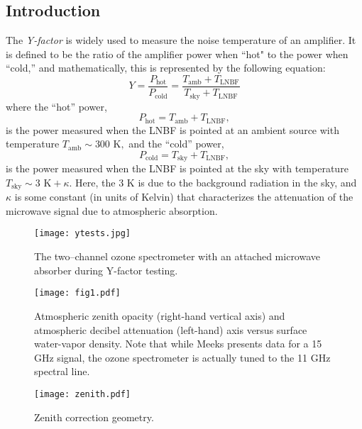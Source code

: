 \documentclass[11pt]{article}
\begin{document}
\subsection{Introduction}
The \textit{Y-factor} is widely used to measure the noise temperature of an amplifier. It is defined to be the ratio of the amplifier power when ``hot" to the power when ``cold,'' and mathematically, this is represented by the following equation:
	\begin{equation}\label{AOK}
		Y = \frac{P_\text{hot}}{P_\text{cold}} = \frac{T_\text{amb}+T_\text{LNBF}}{T_\text{sky}+T_\text{LNBF}}
	\end{equation}
where the ``hot'' power,
	\begin{equation}
		P_\text{hot}=T_\text{amb}+T_\text{LNBF},
	\end{equation} 
is the power measured when the LNBF is pointed at an ambient source with temperature $T_\text{amb} \sim 300 \text{ K},$ and the ``cold'' power,
	\begin{equation}
		P_\text{cold} = T_\text{sky} + T_\text{LNBF},
	\end{equation} 
is the power measured when the LNBF is pointed at the sky with temperature $T_\text{sky} \sim 3 \text{ K} + \kappa.$ Here, the 3 K is due to the background radiation in the sky, and $\kappa$ is some constant (in units of Kelvin) that characterizes the attenuation of the microwave signal due to atmospheric absorption. 
	\begin{figure}[t]
		\centering
		\texttt{[image: ytests.jpg]}
		\caption{The two--channel ozone spectrometer with an attached microwave absorber during Y-factor testing.}		\label{ytests}


	\end{figure}
	\begin{figure}[h]
		\centering
		\texttt{[image: fig1.pdf]}
				\caption{Atmospheric zenith opacity (right-hand vertical axis) and atmospheric decibel attenuation (left-hand) axis versus surface water-vapor density. Note that while Meeks presents data for a 15 GHz signal, the ozone spectrometer is actually tuned to the 11 GHz spectral line.}		\label{fig1}

	\end{figure}	
\begin{figure}[t]
	\centering
	\texttt{[image: zenith.pdf]}
		\caption{Zenith correction geometry.}\label{Fig8}

\end{figure}
\end{document}

